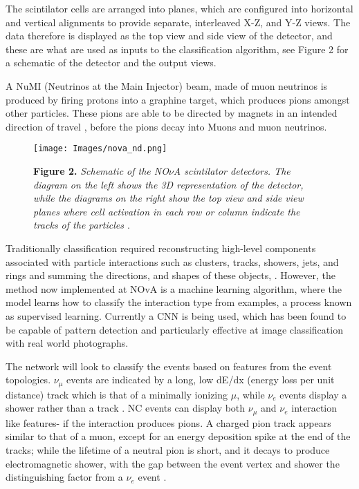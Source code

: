 \noindent The scintilator cells are arranged into planes, which are configured into horizontal and vertical alignments to provide separate, interleaved X-Z, and Y-Z views. The data therefore is displayed as the top view and side view of the detector, and these are what are used as inputs to the classification algorithm, see Figure 2 for a schematic of the detector and the output views.\medskip

\noindent A NuMI (Neutrinos at the Main Injector) beam, made of muon neutrinos is produced by firing protons into a graphine target, which produces pions amongst other particles. These pions are able to be directed by magnets in an intended direction of travel , before the pions decay into Muons and muon neutrinos. \cite{Ishitsuka} \medskip

\begin{figure}[t]
 \centering
 \texttt{[image: Images/nova\_nd.png]} 
 
\textbf{ Figure 2.} \textit{Schematic of the NO$\nu$A scintilator detectors. The diagram on the left shows the 3D representation of the detector, while the diagrams on the right show the top view and side view planes where cell activation in each row or column indicate the tracks of the particles \cite{Aurisano}}.
\end{figure}

\noindent Traditionally classification required reconstructing high-level components associated with particle interactions such as clusters, tracks, showers, jets, and rings and summing the directions, and shapes of these objects, \cite{Aurisano}. However, the method now implemented at NOvA is a machine learning algorithm, where the model learns how to classify the interaction type from examples, a process known as supervised learning. Currently a CNN is being used, which has been found to be capable of pattern detection and particularly effective at image classification with real world photographs. \medskip

\noindent The network will look to classify the events based on features from the event topologies. $\nu_\mu$ events are indicated by a long, low dE/dx (energy loss per unit distance) track which is that of a minimally ionizing $\mu$, while $\nu_e$ events display a shower rather than a track . NC events can display both $\nu_\mu$ and  $\nu_e$ interaction like features- if the interaction produces pions. A charged pion track appears similar to that of a muon, except for an energy deposition spike at the end of the tracks; while the lifetime of a neutral pion is short, and it decays to produce electromagnetic shower, with the gap between the event vertex and shower the distinguishing factor from a $\nu_e$ event \cite{Aurisano}. \medskip

